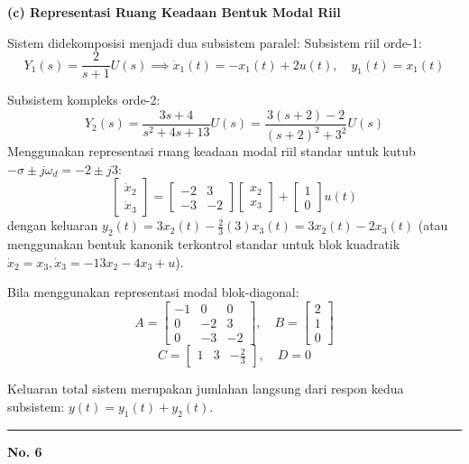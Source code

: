 \documentclass[11pt,a4paper]{article}
\begin{document}
\textbf{(c) Representasi Ruang Keadaan Bentuk Modal Riil}

Sistem didekomposisi menjadi dua subsistem paralel:
Subsistem riil orde-1:
$$Y_1(s) = \frac{2}{s+1} U(s) \implies \dot{x}_1(t) = -x_1(t) + 2u(t), \quad y_1(t) = x_1(t)$$

Subsistem kompleks orde-2:
$$Y_2(s) = \frac{3s + 4}{s^2 + 4s + 13} U(s) = \frac{3(s+2) - 2}{(s+2)^2 + 3^2} U(s)$$
Menggunakan representasi ruang keadaan modal riil standar untuk kutub $-\sigma \pm j\omega_d = -2 \pm j3$:
$$\begin{bmatrix} \dot{x}_2 \\ \dot{x}_3 \end{bmatrix} = \begin{bmatrix} -2 & 3 \\ -3 & -2 \end{bmatrix} \begin{bmatrix} x_2 \\ x_3 \end{bmatrix} + \begin{bmatrix} 1 \\ 0 \end{bmatrix} u(t)$$
dengan keluaran $y_2(t) = 3x_2(t) - \frac{2}{3}(3) x_3(t) = 3x_2(t) - 2x_3(t)$ (atau menggunakan bentuk kanonik terkontrol standar untuk blok kuadratik $\dot{x}_2 = x_3, \dot{x}_3 = -13x_2 - 4x_3 + u$).

Bila menggunakan representasi modal blok-diagonal:
$$A = \begin{bmatrix} -1 & 0 & 0 \\ 0 & -2 & 3 \\ 0 & -3 & -2 \end{bmatrix}, \quad B = \begin{bmatrix} 2 \\ 1 \\ 0 \end{bmatrix}$$
$$C = \begin{bmatrix} 1 & 3 & -\frac{2}{3} \end{bmatrix}, \quad D = 0$$

Keluaran total sistem merupakan jumlahan langsung dari respon kedua subsistem: $y(t) = y_1(t) + y_2(t)$.

\vspace{12pt}
\hrule
\vspace{10pt}

\textbf{\large No. 6}
\end{document}
